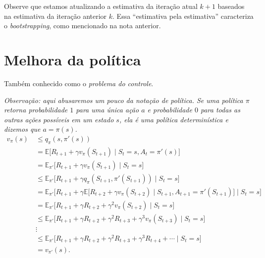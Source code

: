 \documentclass{article}
\begin{document}
            Observe que estamos atualizando a estimativa da iteração atual $k+1$ baseados na estimativa da iteração anterior $k$. Essa ``estimativa pela estimativa'' caracteriza o \emph{bootstrapping}, como mencionado na nota anterior.
        
    \section{Melhora da política}
    
        Também conhecido como o \textit{problema do controle}.
        
        \emph{Observação: aqui abusaremos um pouco da notação de política. Se uma política $\pi$ retorna probabilidade $1$ para uma única ação $a$ e probabilidade $0$ para todas as outras ações possíveis em um estado $s$, ela é uma política \emph{determinística} e dizemos que $a = \pi(s)$.}
        \begin{equation}
            \label{eq:policy-improvement-theorem}
            \begin{split}
                v_{\pi}(s) 
                    & \ \le q_{\pi}(s, \pi'(s)) \\
                    & \ = \mathbb{E} \big[ R_{t+1} + \gamma v_{\pi}(S_{t+1}) \mid S_t = s, A_t = \pi'(s) \big] \\
                    & \ = \mathbb{E}_{\pi'} \big[ R_{t+1} + \gamma v_{\pi}(S_{t+1}) \mid S_t = s \big] \\
                    & \ \le \mathbb{E}_{\pi'} \big[ R_{t+1} + \gamma q_{\pi}(S_{t+1}, \pi'(S_{t+1})) \mid S_t = s \big] \\
                    & \ = \mathbb{E}_{\pi'} \Big[ R_{t+1} + \gamma \mathbb{E} \big[ R_{t+2} + \gamma v_{\pi} (S_{t+2}) \mid S_{t+1}, A_{t+1} = \pi'(S_{t+1}) \big] \mid S_t = s \Big] \\
                    & \ = \mathbb{E}_{\pi'} \big[ R_{t+1} + \gamma R_{t+2} + \gamma^2 v_{\pi}(S_{t+2}) \mid S_t = s \big] \\
                    & \ \le \mathbb{E}_{\pi'} \big[ R_{t+1} + \gamma R_{t+2} + \gamma^2 R_{t+3} + \gamma^3 v_{\pi}(S_{t+3}) \mid S_t = s \big] \\
                    & \ \vdots \\
                    & \ \le \mathbb{E}_{\pi'} \big[ R_{t+1} + \gamma R_{t+2} + \gamma^2 R_{t+3} + \gamma^3 R_{t+4} + \cdots \mid S_t = s \big] \\
                    & \ = v_{\pi'}(s) .
            \end{split}
        \end{equation}
    
\end{document}
